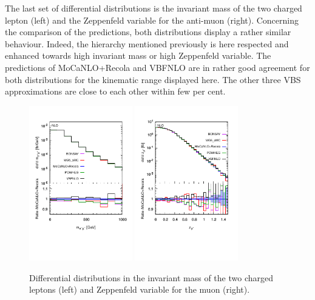 \documentclass[twocolumn,epjc3]{svjour3} %
\newlength{\width}
\begin{document}
    The last set of differential distributions is the invariant mass of the two charged lepton (left) and the Zeppenfeld variable for the anti-muon (right).
    Concerning the comparison of the predictions, both distributions display a rather similar behaviour.
    Indeed, the hierarchy mentioned previously is here respected and enhanced towards high invariant mass or high Zeppenfeld variable.
    The predictions of {\sc MoCaNLO}+{\sc Recola} and {\sc VBFNLO} are in rather good agreement for both distributions for the kinematic range displayed here.
    The other three VBS approximations are close to each other within few per cent.

     \begin{figure}[hbt!]
       \centering
       \includegraphics[width=0.4\textwidth,angle=0,clip=true,trim={0.4cm 2cm 0.cm 1.cm}]{figures/NLO/mll_NLO.pdf}
       \includegraphics[width=0.4\textwidth,angle=0,clip=true,trim={0.4cm 2cm 0.cm 1.cm}]{figures/NLO/zmu_NLO.pdf}
    \caption{\label{fig:distNLO3} Differential distributions in the invariant mass of the two charged leptons (left) and Zeppenfeld variable for the muon (right).
}
\end{figure}
\end{document}
